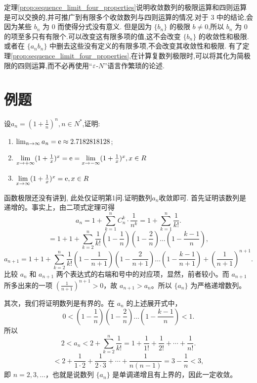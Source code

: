 定理\ref{prop:sequence_limit_four_properties}说明收敛数列的极限运算和四则运算是可以交换的,并可推广到有限多个收敛数列与四则运算的情况.对于 3 中的结论,会因为某些 $b_n$ 为 $0$ 而使得分式没有意义. 但是因为 $\{b_n\}$ 的极限 $b \neq 0$,所以 $b_n$ 为 $0$ 的项至多只有有限个.可以改变这有限多项的值,这不会改变 $\{b_n\}$ 的收敛性和极限.或者在 $\{a_n b_n\}$ 中删去这些没有定义的有限多项,不会改变其收敛性和极限.
有了定理\ref{prop:sequence_limit_four_properties},在计算复数列极限时,可以将其化为简极限的四则运算,而不必再使用“$\varepsilon$-$N$”语言作繁琐的论述.


\section{例题}

\begin{example}\label{example:e_n}
    设$a_n= (1+ \frac 1n )^n , n \in N^*$,证明:
    \begin{enumerate}
        \item $\lim_{n \to \infty} a_n = \mathrm{e} \approx 2.7182818128$;
        \item $\underset{x\rightarrow +\infty }{\lim} (1 +\frac 1x )^x = \mathrm{e} =\underset{x\rightarrow -\infty }{\lim} (1 +\frac 1x )^x,x \in R$
        \item $\underset{x\rightarrow \infty }{\lim} (1 +\frac 1x )^x = \mathrm{e}, x \in R$
    \end{enumerate}

    \begin{solution}
        函数极限还没有讲到, 此处仅证明第1问.证明数列$a_n$收敛即可.
        首先证明该数列是递增的。事实上，由二项式定理可得
        $$
        a_n = 1 + \sum_{k=1}^{n} C_n^k \cdot \frac{1}{n^k} = 1 + \sum_{k=1}^{n} \frac{1}{k!}.
        $$
        $$
        = 1 + 1 + \sum_{k=2}^{n} \frac{1}{k!} \left( 1 - \frac{1}{n} \right) \left( 1 - \frac{2}{n} \right) \dots \left( 1 - \frac{k-1}{n} \right),
        $$
        $$
        a_{n+1} = 1 + 1 + \sum_{k=2}^{n} \frac{1}{k!} \left( 1 - \frac{1}{n+1} \right) \left( 1 - \frac{2}{n+1} \right) \dots \left( 1 - \frac{k-1}{n+1} \right) + \left( \frac{1}{n+1} \right)^{n+1}.
        $$
        比较 $a_n$ 和 $a_{n+1}$ 两个表达式的右端和号中的对应项，显然，前者较小。而 $a_{n+1}$ 所多出来的一项 $\left( \frac{1}{n+1} \right)^{n+1} > 0$，故 $a_{n+1} > a_n$。所以 $\{a_n\}$ 为严格递增数列。
        
        其次，我们将证明数列是有界的。在 $a_n$ 的上述展开式中，
        $$
        0 < \left( 1 - \frac{1}{n} \right) \left( 1 - \frac{2}{n} \right) \dots \left( 1 - \frac{k-1}{n} \right) < 1.
        $$
        所以
        $$
        2 < a_n < 2 + \sum_{k=2}^{n} \frac{1}{k!} = 1 + \frac{1}{1!} + \frac{1}{2!} + \cdots + \frac{1}{n!}.
        $$
        $$
        < 2 + \frac{1}{1 \cdot 2} + \frac{1}{2 \cdot 3} + \cdots + \frac{1}{n(n-1)} = 3 - \frac{1}{n} < 3,
        $$
        即 $n = 2, 3, \dots$，也就是说数列 $\{a_n\}$ 是单调递增且有上界的，因此一定收敛。
    \end{solution}

\end{example}



